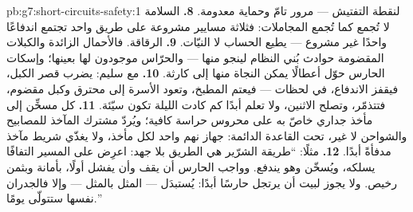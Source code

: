 \begin{solution}{pb:g7:short-circuits-safety:1}
لنقطة التفتيش --- مرور تامّ وحماية معدومة.
\textbf{8.} السلامة لا تُجمع كما تُجمع المجاملات: فثلاثة مسايير
مشروعة على طريق واحد تجتمع اندفاعًا واحدًا غير مشروع ---
 يطيع الحساب لا النيّات.
\textbf{9.} الرقاقة. فالأحمال الزائدة والكبلات المقضومة حوادث
بُني النظام لينجو منها --- والحرّاس موجودون لها بعينها؛ وإسكات
الحارس حوّل أعطالًا يمكن النجاة منها إلى كارثة.
\textbf{10.} مع  سليم: يضرب قصر الكبل، فيقفز الاندفاع،
  في لحظات --- فيعتم المطبخ، وتعود الأسرة إلى 
محترق وكبل مقضوم، فتتذمّر، وتصلح الاثنين، ولا تعلم أبدًا كم
كادت الليلة تكون سيّئة.
\textbf{11.} كل مسخِّن إلى مأخذ جداري خاصّ به على  محروس
حراسة كافية؛ ويُردّ مشترك المآخذ للمصابيح والشواحن لا غير،
تحت القاعدة الدائمة: جهاز نهم واحد لكل مأخذ، ولا يغذّي شريط
مآخذ مدفأةً أبدًا.
\textbf{12.} مثلًا: ``طريقة الشرّير هي الطريق بلا جهد: اعرِض
على المسير التفافًا يسلكه، ويُسخّن وهو يندفع. وواجب الحارس أن
يقف  وأن يفشل أولًا، بأمانة وبثمن رخيص. ولا يجوز
لبيت أن يرتجل حارسًا أبدًا:  يُستبدَل  --- المثل
بالمثل --- وإلا فالجدران نفسها ستتولّى  يومًا.''
\end{solution}
